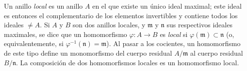 \begin{env}[1.0.7]
\label{0.1.0.7-fr}
Un anillo \emph{local} es un anillo $A$ en el que existe un único ideal maximal; este ideal es entonces el complementario de los elementos invertibles y contiene todos los ideales $\neq A$.
Si $A$ y $B$ son dos anillos locales, y $\mathfrak{m}$ y $\mathfrak{n}$ sus respectivos ideales maximales, se dice que un homomorfismo $\varphi:A\to B$ es \emph{local} si $\varphi(\mathfrak{m})\subset\mathfrak{n}$ (o, equivalentemente, si $\varphi^{-1}(\mathfrak{n})=\mathfrak{m}$).
Al pasar a los cocientes, un homomorfismo de este tipo define un monomorfismo del cuerpo residual $A/\mathfrak{m}$ al cuerpo residual $B/\mathfrak{n}$.
La composición de dos homomorfismos locales es un homomorfismo local.
\end{env}
